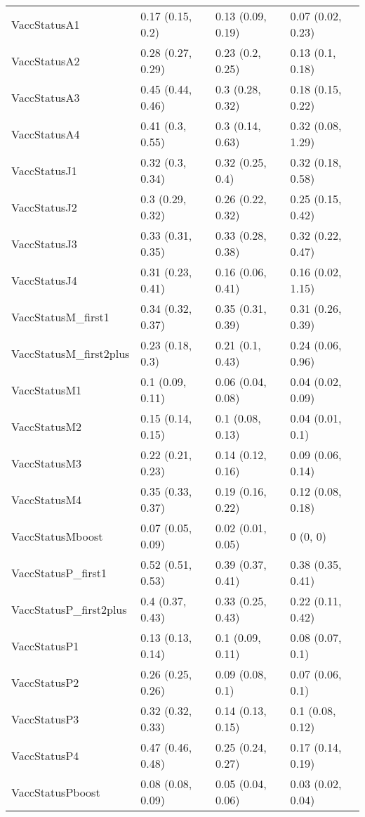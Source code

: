 \begin{table}[ht]
\begin{tabular}{llll}
  VaccStatusA1 & 0.17 (0.15, 0.2) & 0.13 (0.09, 0.19) & 0.07 (0.02, 0.23) \\ 
  VaccStatusA2 & 0.28 (0.27, 0.29) & 0.23 (0.2, 0.25) & 0.13 (0.1, 0.18) \\ 
  VaccStatusA3 & 0.45 (0.44, 0.46) & 0.3 (0.28, 0.32) & 0.18 (0.15, 0.22) \\ 
  VaccStatusA4 & 0.41 (0.3, 0.55) & 0.3 (0.14, 0.63) & 0.32 (0.08, 1.29) \\ 
  VaccStatusJ1 & 0.32 (0.3, 0.34) & 0.32 (0.25, 0.4) & 0.32 (0.18, 0.58) \\ 
  VaccStatusJ2 & 0.3 (0.29, 0.32) & 0.26 (0.22, 0.32) & 0.25 (0.15, 0.42) \\ 
  VaccStatusJ3 & 0.33 (0.31, 0.35) & 0.33 (0.28, 0.38) & 0.32 (0.22, 0.47) \\ 
  VaccStatusJ4 & 0.31 (0.23, 0.41) & 0.16 (0.06, 0.41) & 0.16 (0.02, 1.15) \\ 
  VaccStatusM\_first1 & 0.34 (0.32, 0.37) & 0.35 (0.31, 0.39) & 0.31 (0.26, 0.39) \\ 
  VaccStatusM\_first2plus & 0.23 (0.18, 0.3) & 0.21 (0.1, 0.43) & 0.24 (0.06, 0.96) \\ 
  VaccStatusM1 & 0.1 (0.09, 0.11) & 0.06 (0.04, 0.08) & 0.04 (0.02, 0.09) \\ 
  VaccStatusM2 & 0.15 (0.14, 0.15) & 0.1 (0.08, 0.13) & 0.04 (0.01, 0.1) \\ 
  VaccStatusM3 & 0.22 (0.21, 0.23) & 0.14 (0.12, 0.16) & 0.09 (0.06, 0.14) \\ 
  VaccStatusM4 & 0.35 (0.33, 0.37) & 0.19 (0.16, 0.22) & 0.12 (0.08, 0.18) \\ 
  VaccStatusMboost & 0.07 (0.05, 0.09) & 0.02 (0.01, 0.05) & 0 (0, 0) \\ 
  VaccStatusP\_first1 & 0.52 (0.51, 0.53) & 0.39 (0.37, 0.41) & 0.38 (0.35, 0.41) \\ 
  VaccStatusP\_first2plus & 0.4 (0.37, 0.43) & 0.33 (0.25, 0.43) & 0.22 (0.11, 0.42) \\ 
  VaccStatusP1 & 0.13 (0.13, 0.14) & 0.1 (0.09, 0.11) & 0.08 (0.07, 0.1) \\ 
  VaccStatusP2 & 0.26 (0.25, 0.26) & 0.09 (0.08, 0.1) & 0.07 (0.06, 0.1) \\ 
  VaccStatusP3 & 0.32 (0.32, 0.33) & 0.14 (0.13, 0.15) & 0.1 (0.08, 0.12) \\ 
  VaccStatusP4 & 0.47 (0.46, 0.48) & 0.25 (0.24, 0.27) & 0.17 (0.14, 0.19) \\ 
  VaccStatusPboost & 0.08 (0.08, 0.09) & 0.05 (0.04, 0.06) & 0.03 (0.02, 0.04) \\ 
   \hline
\end{tabular}
\end{table}
